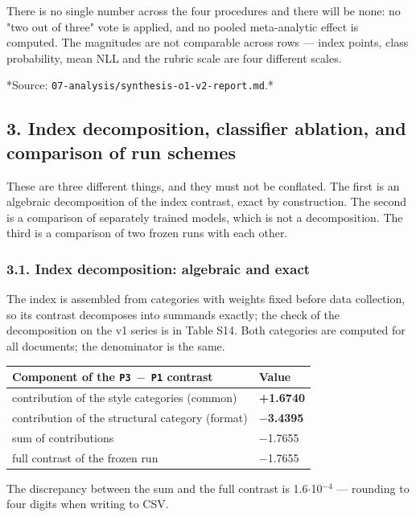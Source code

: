\documentclass[11pt,a4paper]{article}
\renewcommand{\_}{\textunderscore\allowbreak}
\begin{document}
There is no single number across the four procedures and there will be none:
no "two out of three" vote is applied, and no pooled meta-analytic effect is
computed. The magnitudes are not comparable across rows — index points, class
probability, mean NLL and the rubric scale are four different scales.

*Source: \texttt{07-\allowbreak{}analysis/synthesis-\allowbreak{}o1-\allowbreak{}v2-\allowbreak{}report.md}.*

\subsection{3. Index decomposition, classifier ablation, and comparison of run schemes}

These are three different things, and they must not be conflated. The first is
an algebraic decomposition of the index contrast, exact by construction. The
second is a comparison of separately trained models, which is not a
decomposition. The third is a comparison of two frozen runs with each other.

\subsubsection{3.1. Index decomposition: algebraic and exact}

The index is assembled from categories with weights fixed before data
collection, so its contrast decomposes into summands exactly; the check of the
decomposition on the v1 series is in Table S14. Both categories are computed
for all documents; the denominator is the same.

\begin{center}
\small
\begin{tabularx}{\textwidth}{Xl}
\toprule
Component of the \texttt{P3 $-$ P1} contrast & Value \\
\midrule
contribution of the style categories (common) & \textbf{+1.6740} \\
contribution of the structural category (format) & \textbf{$-$3.4395} \\
sum of contributions & $-$1.7655 \\
full contrast of the frozen run & $-$1.7655 \\
\bottomrule
\end{tabularx}
\end{center}

The discrepancy between the sum and the full contrast is 1.6$\cdot$10$^{-4}$ — rounding
to four digits when writing to CSV.
\end{document}
